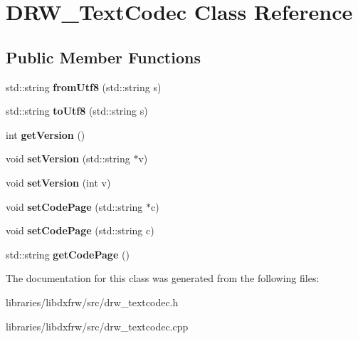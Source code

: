 \hypertarget{classDRW__TextCodec}{\section{D\-R\-W\-\_\-\-Text\-Codec Class Reference}
\label{classDRW__TextCodec}
}
\subsection*{Public Member Functions}
\begin{DoxyCompactItemize}
\item 
\hypertarget{classDRW__TextCodec_a419c627534dbd7f4833645da731252fc}{std\-::string {\bfseries from\-Utf8} (std\-::string s)}\label{classDRW__TextCodec_a419c627534dbd7f4833645da731252fc}

\item 
\hypertarget{classDRW__TextCodec_a92e43a499c188f5fb7369a5aa2305d5f}{std\-::string {\bfseries to\-Utf8} (std\-::string s)}\label{classDRW__TextCodec_a92e43a499c188f5fb7369a5aa2305d5f}

\item 
\hypertarget{classDRW__TextCodec_a96e92e2238fd3537a7c9c879127d8723}{int {\bfseries get\-Version} ()}\label{classDRW__TextCodec_a96e92e2238fd3537a7c9c879127d8723}

\item 
\hypertarget{classDRW__TextCodec_acb26968d066ec3ae86f17353cdef578c}{void {\bfseries set\-Version} (std\-::string $\ast$v)}\label{classDRW__TextCodec_acb26968d066ec3ae86f17353cdef578c}

\item 
\hypertarget{classDRW__TextCodec_af898b573cddf5405f26aa63d5df52bb1}{void {\bfseries set\-Version} (int v)}\label{classDRW__TextCodec_af898b573cddf5405f26aa63d5df52bb1}

\item 
\hypertarget{classDRW__TextCodec_a201a8377c42e01aa2661183a521e4844}{void {\bfseries set\-Code\-Page} (std\-::string $\ast$c)}\label{classDRW__TextCodec_a201a8377c42e01aa2661183a521e4844}

\item 
\hypertarget{classDRW__TextCodec_aa548e21e9b40cacdbbf16a683329f56a}{void {\bfseries set\-Code\-Page} (std\-::string c)}\label{classDRW__TextCodec_aa548e21e9b40cacdbbf16a683329f56a}

\item 
\hypertarget{classDRW__TextCodec_af8fa21d94d07ccb5b3d8b2f64c4964de}{std\-::string {\bfseries get\-Code\-Page} ()}\label{classDRW__TextCodec_af8fa21d94d07ccb5b3d8b2f64c4964de}

\end{DoxyCompactItemize}


The documentation for this class was generated from the following files\-:\begin{DoxyCompactItemize}
\item 
libraries/libdxfrw/src/drw\-\_\-textcodec.\-h\item 
libraries/libdxfrw/src/drw\-\_\-textcodec.\-cpp\end{DoxyCompactItemize}
